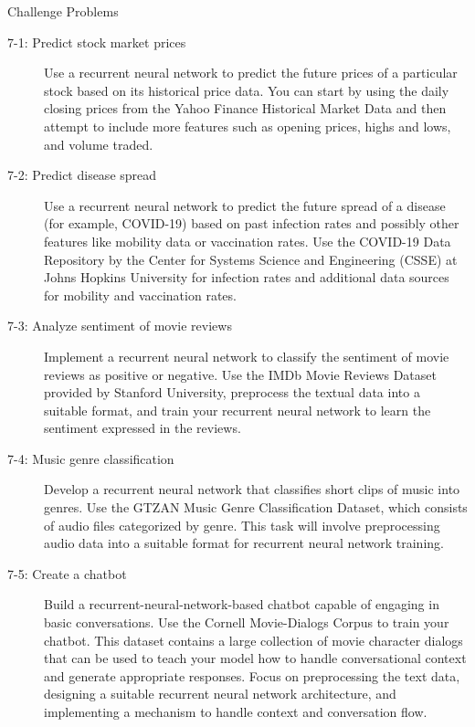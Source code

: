 \begin{nspbox}{Challenge Problems}
\begin{description}
    \item [7-1: Predict stock market prices]
    Use a recurrent neural network to predict the future prices of a particular stock based on its historical price data. You can start by using the daily closing prices from the Yahoo Finance Historical Market Data and then attempt to include more features such as opening prices, highs and lows, and volume traded.

    \item [7-2: Predict disease spread] 
    Use a recurrent neural network to predict the future spread of a disease (for example, COVID-19) based on past infection rates and possibly other features like mobility data or vaccination rates. Use the COVID-19 Data Repository by the Center for Systems Science and Engineering (CSSE) at Johns Hopkins University for infection rates and additional data sources for mobility and vaccination rates.

    \item [7-3: Analyze sentiment of movie reviews]
    Implement a recurrent neural network to classify the sentiment of movie reviews as positive or negative. Use the IMDb Movie Reviews Dataset provided by Stanford University, preprocess the textual data into a suitable format, and train your recurrent neural network to learn the sentiment expressed in the reviews.

    \item [7-4: Music genre classification] 
    Develop a recurrent neural network that classifies short clips of music into genres. Use the GTZAN Music Genre Classification Dataset, which consists of audio files categorized by genre. This task will involve preprocessing audio data into a suitable format for recurrent neural network training.

    \item [7-5: Create a chatbot]
    Build a recurrent-neural-network-based chatbot capable of engaging in basic conversations. Use the Cornell Movie-Dialogs Corpus to train your chatbot. This dataset contains a large collection of movie character dialogs that can be used to teach your model how to handle conversational context and generate appropriate responses. Focus on preprocessing the text data, designing a suitable recurrent neural network architecture, and implementing a mechanism to handle context and conversation flow.
\end{description}    
\end{nspbox}